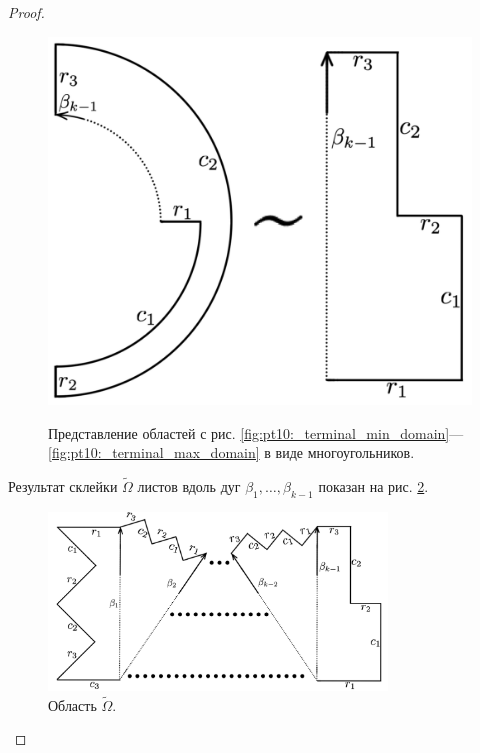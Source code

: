 \begin{proof}
\begin{figure}[!htb]
\caption{}
    \label{fig:pt10:_branching_domain_transformed}
\endminipage\hfill
{}
\centering
\includegraphics[scale=0.1]{images/section3_circular/atoms/branching/terminal_max_transformed.pdf}
\caption{}
    \label{fig:pt10:_terminal_max_domain_transformed}
\endminipage\hfill

\medskip


\centering
Представление областей с рис. \ref{fig:pt10:_terminal_min_domain}---\ref{fig:pt10:_terminal_max_domain} в виде многоугольников.
\end{figure}

Результат склейки $\widetilde{\Omega}$ листов вдоль дуг $\beta_1, \ldots, \beta_{k-1}$ показан на рис.    \ref{fig:pt10:_big_domain_transformed}.
\begin{figure}[!htb]
\centering
\includegraphics[width=9cm]{images/section3_circular/atoms/branching/big_domain_transformed.pdf}
    \caption{Область $\widetilde{\Omega}$.}
    \label{fig:pt10:_big_domain_transformed}
\end{figure}


\end{proof}
